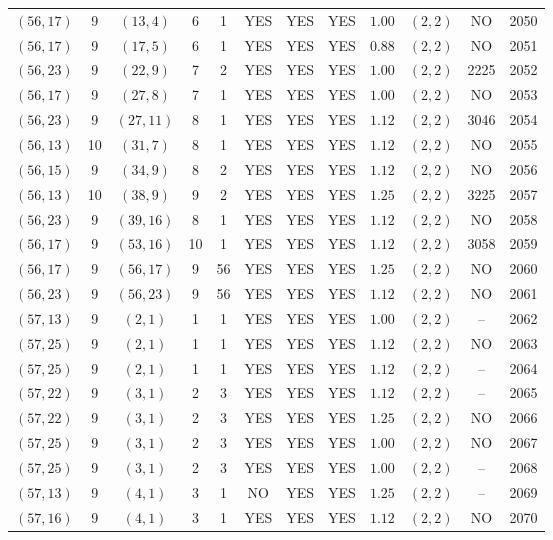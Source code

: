 \begin{longtable}{|c|c|c|c|c|c|c|c|c|c|c|c|}
$(56,17)$ & 9 & $(13,4)$ & 6 & 1 & YES & YES & YES & $1.00$ & $(2,2)$ & NO & 2050\\
$(56,17)$ & 9 & $(17,5)$ & 6 & 1 & YES & YES & YES & $0.88$ & $(2,2)$ & NO & 2051\\
$(56,23)$ & 9 & $(22,9)$ & 7 & 2 & YES & YES & YES & $1.00$ & $(2,2)$ & 2225 & 2052\\
$(56,17)$ & 9 & $(27,8)$ & 7 & 1 & YES & YES & YES & $1.00$ & $(2,2)$ & NO & 2053\\
$(56,23)$ & 9 & $(27,11)$ & 8 & 1 & YES & YES & YES & $1.12$ & $(2,2)$ & 3046 & 2054\\
$(56,13)$ & 10 & $(31,7)$ & 8 & 1 & YES & YES & YES & $1.12$ & $(2,2)$ & NO & 2055\\
$(56,15)$ & 9 & $(34,9)$ & 8 & 2 & YES & YES & YES & $1.12$ & $(2,2)$ & NO & 2056\\
$(56,13)$ & 10 & $(38,9)$ & 9 & 2 & YES & YES & YES & $1.25$ & $(2,2)$ & 3225 & 2057\\
$(56,23)$ & 9 & $(39,16)$ & 8 & 1 & YES & YES & YES & $1.12$ & $(2,2)$ & NO & 2058\\
$(56,17)$ & 9 & $(53,16)$ & 10 & 1 & YES & YES & YES & $1.12$ & $(2,2)$ & 3058 & 2059\\
$(56,17)$ & 9 & $(56,17)$ & 9 & 56 & YES & YES & YES & $1.25$ & $(2,2)$ & NO & 2060\\
$(56,23)$ & 9 & $(56,23)$ & 9 & 56 & YES & YES & YES & $1.12$ & $(2,2)$ & NO & 2061\\
$(57,13)$ & 9 & $(2,1)$ & 1 & 1 & YES & YES & YES & $1.00$ & $(2,2)$ & -- & 2062\\
$(57,25)$ & 9 & $(2,1)$ & 1 & 1 & YES & YES & YES & $1.12$ & $(2,2)$ & NO & 2063\\
$(57,25)$ & 9 & $(2,1)$ & 1 & 1 & YES & YES & YES & $1.12$ & $(2,2)$ & -- & 2064\\
$(57,22)$ & 9 & $(3,1)$ & 2 & 3 & YES & YES & YES & $1.12$ & $(2,2)$ & -- & 2065\\
$(57,22)$ & 9 & $(3,1)$ & 2 & 3 & YES & YES & YES & $1.25$ & $(2,2)$ & NO & 2066\\
$(57,25)$ & 9 & $(3,1)$ & 2 & 3 & YES & YES & YES & $1.00$ & $(2,2)$ & NO & 2067\\
$(57,25)$ & 9 & $(3,1)$ & 2 & 3 & YES & YES & YES & $1.00$ & $(2,2)$ & -- & 2068\\
$(57,13)$ & 9 & $(4,1)$ & 3 & 1 & NO & YES & YES & $1.25$ & $(2,2)$ & -- & 2069\\
$(57,16)$ & 9 & $(4,1)$ & 3 & 1 & YES & YES & YES & $1.12$ & $(2,2)$ & NO & 2070\\

\end{longtable}
